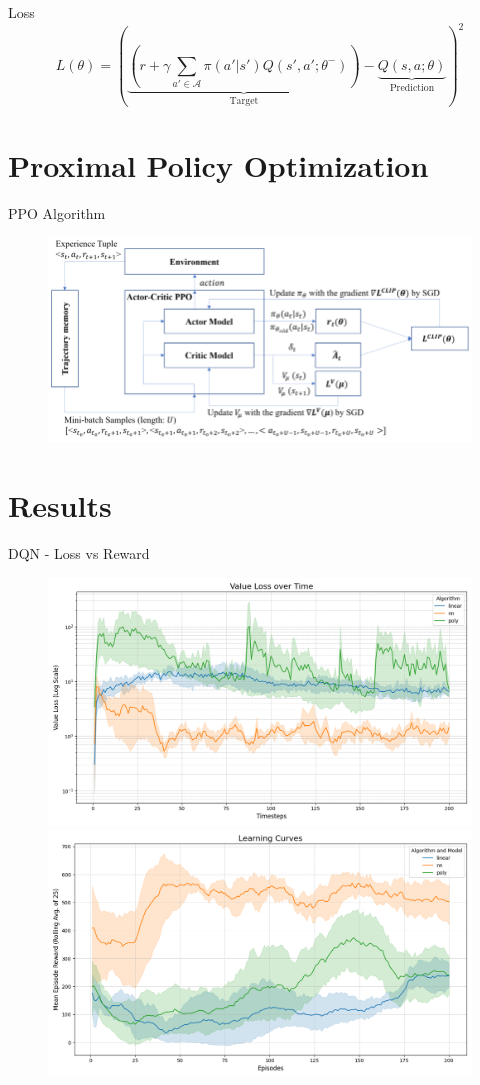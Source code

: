 \documentclass[serif]{beamer}  %
\begin{document}
\begin{frame}{Loss}
$$L(\theta) = \left( \underbrace{\left( r + \gamma \sum_{a' \in \mathcal{A}} \pi(a'|s') Q(s', a'; \theta^-) \right)}_{\text{Target}} - \underbrace{Q(s, a; \theta)}_{\text{Prediction}} \right)^2$$
\end{frame}

\section{Proximal Policy Optimization}

\begin{frame}{PPO Algorithm}
    \begin{figure}
        \centering
        \includegraphics[width=\linewidth]{images/PPO_diagram.png}
    \end{figure}
\end{frame}

\section{Results}

\begin{frame}{DQN - Loss vs Reward}
    \begin{figure}
        \centering
        \includegraphics[width=0.48\linewidth]{plots/dqn_value_loss_curve.png}
        \hfill
        \includegraphics[width=0.48\linewidth]{plots/dqn_reward_curve.png}
    \end{figure}
\end{frame}
\end{document}
